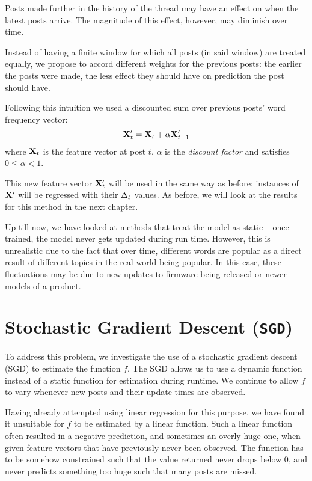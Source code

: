 Posts made further in the history of the thread may have an effect on when the 
latest posts arrive. The magnitude of this effect, however, may diminish over 
time.

Instead of having a finite window for which all posts (in said window) are 
treated equally, we propose to accord different weights for the previous posts: the earlier the posts were made, the less effect they should have on prediction 
the post should have.

Following this intuition we used a discounted sum over previous posts' word 
frequency vector:
\[
	\mathbf{X}'_t = \mathbf{X}_t + \alpha \mathbf{X}'_{t-1}
\]
where $\mathbf{X}_t$ is the feature vector at post $t$. $\alpha$ is the \emph{discount 
factor} and satisfies $0 \leq \alpha < 1$.

This new feature vector $\mathbf{X}'_t$ will be used in the same way as before; 
instances of $\mathbf{X}'$ will be regressed with their $\Delta_t$ values. As before, we will 
look at the results for this method in the next chapter.

Up till now, we have looked at methods that treat the model as static -- once 
trained, the model never gets updated during run time. However, this is 
unrealistic due to the fact that over time, different words are popular as a 
direct result of different topics in the real world being popular. In this case, 
these fluctuations may be due to new updates to firmware being released or newer 
models of a product.

\section{Stochastic Gradient Descent (\texttt{SGD})}
To address this problem, we investigate the use of a stochastic gradient descent 
(SGD) to estimate the function $f$.  The SGD allows us to use a dynamic function 
instead of a static function for estimation during runtime.  We continue to 
allow $f$ to vary whenever new posts and their update times are observed.

Having already attempted using linear regression for this purpose, we have found 
it unsuitable for $f$ to be estimated by a linear function. Such a linear 
function often resulted in a negative prediction, and sometimes an 
overly huge one, when given feature vectors that have previously never been 
observed. The function has to be somehow constrained such that the value 
returned never drops below 0, and never predicts something too huge such that 
many posts are missed.

